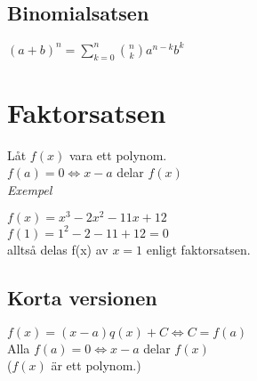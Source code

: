 \documentclass[11pt]{article}
\begin{document}
\subsection{Binomialsatsen}
\begin{center}
$(a+b)^n = \sum\limits_{k=0}^{n} {n \choose k} a^{n-k} b^k $
\end{center}
\section{Faktorsatsen}
Låt $f(x)$ vara ett polynom. \\
$f(a)=0 \Longleftrightarrow x-a $ delar $f(x)$ \\
\emph{Exempel} \\
\begin{center}
$ f(x) = x^3 -2x^2 - 11x +12 $ \\
$ f(1) = 1^2 - 2 -11 + 12 = 0$ \\
alltså delas f(x) av $ x=1 $ enligt faktorsatsen. 
\end{center}
\subsection{Korta versionen}
$f(x) = (x-a)q(x) + C \Longleftrightarrow C=f(a) $ \\
Alla $f(a) = 0 \Longleftrightarrow x-a $ delar $f(x)$ \\
($f(x)$ är ett polynom.)
\end{document}

